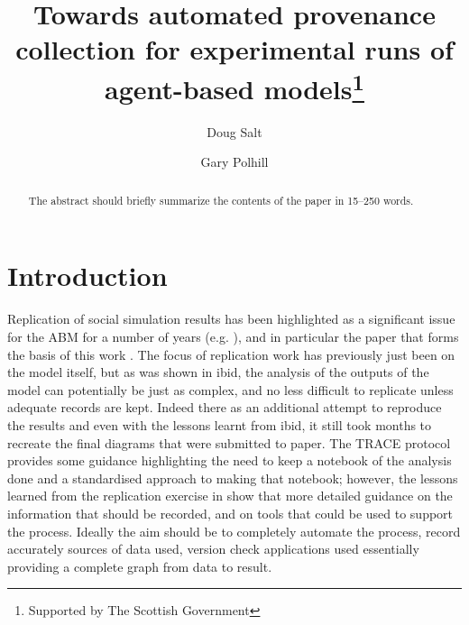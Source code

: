 \documentclass[runningheads]{llncs}
\begin{document}
%
\title{Towards automated provenance collection for experimental runs of agent-based models\thanks{Supported by The Scottish Government}}
%
%
\author{Doug Salt \and
Gary Polhill }
%
%
%
\maketitle              %
%
\begin{abstract}
The abstract should briefly summarize the contents of the paper in
15--250 words.

\end{abstract}
%
%
%
\section{Introduction}

Replication of social simulation results has been highlighted as a significant
issue for the ABM for a number of years (e.g.  \cite{edmonds2003replication}),
and in particular the paper that forms the basis of this work
\cite{polhill2017lessons}.  The focus of replication work has previously just
been on the model itself, but as was shown in ibid, the analysis of the
outputs of the model can potentially be just as complex, and no less difficult
to replicate unless adequate records are kept. Indeed there as an additional
attempt to reproduce the results and even with the lessons learnt from ibid, it
still took months to recreate the final diagrams that were submitted to paper.
The TRACE protocol \cite{schmolke2010ecological,ayllon2021keeping} provides
some guidance highlighting the need to keep a notebook of the analysis done and
a standardised approach to making that notebook; however, the lessons learned
from the replication exercise in \cite{polhill2017lessons} show that more
detailed guidance on the information that should be recorded,  and on tools
that could be used to support the process. Ideally the aim should be to
completely automate the process, record accurately sources of data used,
version check applications used essentially providing a complete graph from
data to result.
\end{document}
